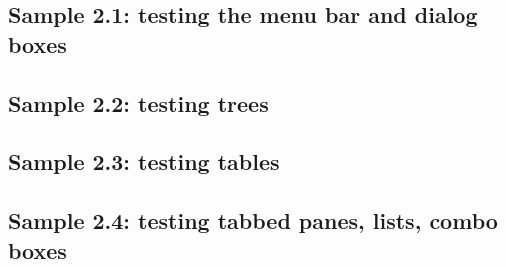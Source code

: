 

\subsection{Sample 2.1: testing the menu bar and dialog boxes}


\subsection{Sample 2.2: testing trees}


\subsection{Sample 2.3: testing tables}


\subsection{Sample 2.4: testing tabbed panes, lists, combo boxes}

